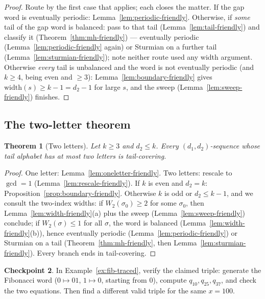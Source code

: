 \documentclass[11pt,reqno]{amsart}
\theoremstyle{plain}
\newtheorem{theorem}{Theorem}[section]
\theoremstyle{definition}
\newtheorem{checkpoint}[theorem]{Checkpoint}   %
\theoremstyle{remark}
\begin{document}
\begin{proof}
Route by the first case that applies; each closes the matter. If the gap word is
eventually periodic: Lemma~\ref{lem:periodic-friendly}. Otherwise, if \emph{some}
tail of the gap word is balanced: pass to that tail (Lemma~\ref{lem:tail-friendly})
and classify it (Theorem~\ref{thm:mh-friendly}) --- eventually periodic
(Lemma~\ref{lem:periodic-friendly} again) or Sturmian on a further tail
(Lemma~\ref{lem:sturmian-friendly}); note neither route used any width argument.
Otherwise \emph{every} tail is unbalanced and the word is not eventually periodic
(and $k \ge 4$, being even and $\ge 3$): Lemma~\ref{lem:boundary-friendly} gives
$\mathrm{width}(s) \ge k - 1 = d_2 - 1$ for large $s$, and the sweep
(Lemma~\ref{lem:sweep-friendly}) finishes.
\end{proof}

\subsection{The two-letter theorem}

\begin{theorem}[Two letters]\label{thm:twoletter-friendly}
Let $k \ge 3$ and $d_2 \le k$. Every $(d_1,d_2)$-sequence whose tail alphabet has
at most two letters is tail-covering.
\end{theorem}

\begin{proof}
One letter: Lemma~\ref{lem:oneletter-friendly}. Two letters: rescale to
$\gcd = 1$ (Lemma~\ref{lem:rescale-friendly}). If $k$ is even and $d_2 = k$:
Proposition~\ref{prop:boundary-friendly}. Otherwise $k$ is odd or $d_2 \le k - 1$,
and we consult the two-index widths: if $W_2(\sigma_0) \ge 2$ for some $\sigma_0$,
then Lemma~\ref{lem:width-friendly}(a) plus the sweep
(Lemma~\ref{lem:sweep-friendly}) conclude; if $W_2(\sigma) \le 1$ for all
$\sigma$, the word is balanced (Lemma~\ref{lem:width-friendly}(b)), hence
eventually periodic (Lemma~\ref{lem:periodic-friendly}) or Sturmian on a tail
(Theorem~\ref{thm:mh-friendly}, then Lemma~\ref{lem:sturmian-friendly}). Every
branch ends in tail-covering.
\end{proof}

\begin{checkpoint}
In Example~\ref{ex:fib-traced}, verify the claimed triple: generate the Fibonacci
word ($0 \mapsto 01$, $1 \mapsto 0$, starting from $0$), compute $q_{10}, q_{25},
q_{37}$, and check the two equations. Then find a different valid triple for the
same $x = 100$.
\end{checkpoint}
\end{document}
